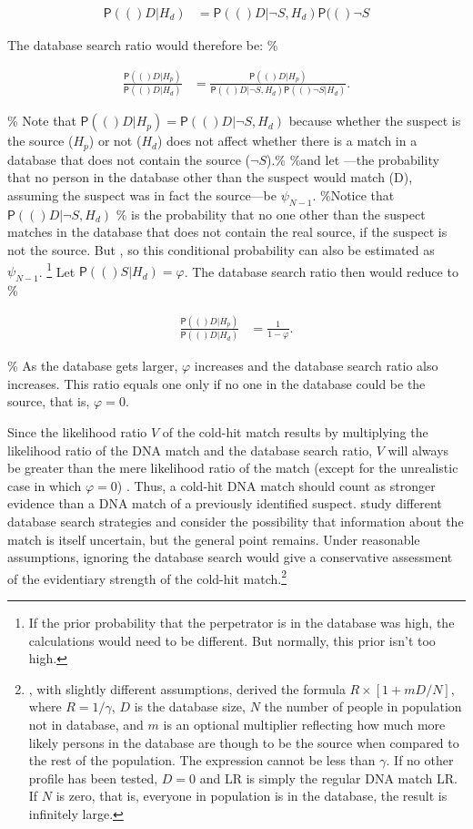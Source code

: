 \documentclass[10pt,dvipsnames,enabledeprecatedfontcommands]{scrartcl}
\newcommand{\pr}[1]{\mathsf{P}(#1)}
\begin{document}
\begin{align*}
\pr(D\vert H_d) & =  \pr(D\vert \neg S, H_d) \pr(\neg S %
\end{align*}

The database search ratio would therefore be: \%

\begin{align*}
\frac{\pr(D\vert H_p)}{\pr(D\vert H_d)} & = \frac{\pr(D\vert H_p)}{\pr(D\vert \neg S, H_d) \pr(\neg S \vert H_d)}.
\end{align*}

\% Note that \(\pr(D\vert H_p)=\pr(D\vert \neg S, H_d)\) because whether
the suspect is the source (\(H_p\)) or not (\(H_d\)) does not affect
whether there is a match in a database that does not contain the source
(\(\neg S\)).\% \%and let ---the probability that no person in the
database other than the suspect would match (D), assuming the suspect
was in fact the source---be \(\psi_{N-1}\). \%Notice that
\(\pr(D\vert \neg S, H_d)\) \% is the probability that no one other than
the suspect matches in the database that does not contain the real
source, if the suspect is not the source. But , so this conditional
probability can also be estimated as \(\psi_{N-1}\).
\footnote{If the prior probability that the perpetrator is in the database was high, the calculations would need to be different. But normally, this prior isn't too high.}
Let \(\pr(S | H_d)=\varphi\). The database search ratio then would
reduce to \%

\begin{align*}
\frac{\pr(D\vert H_p)}{\pr(D\vert H_d)} & = \frac{1}{1-\varphi}.
\end{align*}

\% As the database gets larger, \(\varphi\) increases and the database
search ratio also increases. This ratio equals one only if no one in the
database could be the source, that is, \(\varphi=0\).

Since the likelihood ratio \(V\) of the cold-hit match results by
multiplying the likelihood ratio of the DNA match and the database
search ratio, \(V\) will always be greater than the mere likelihood
ratio of the match (except for the unrealistic case in which
\(\varphi=0\)) . Thus, a cold-hit DNA match should count as stronger
evidence than a DNA match of a previously identified suspect.
\citet{dawid1996CoherentAnalysisForensic} study different database
search strategies and consider the possibility that information about
the match is itself uncertain, but the general point remains. Under
reasonable assumptions, ignoring the database search would give a
conservative assessment of the evidentiary strength of the cold-hit
match.\footnote{\citet{donnelly1999DNADatabaseSearches}, with slightly different assumptions, derived the formula $R \times [1+mD/N]$, where $R = 1/\gamma$, $D$ is the database size, $N$ the number of people in population not in database, and $m$ is an optional multiplier reflecting how much more likely persons in the database are though to be the source when compared to the rest of the population. The expression cannot be less than $\gamma$. If no other profile has been tested, $D=0$ and LR is simply the regular DNA match LR. If $N$ is zero, that is, everyone in population is in the database, the result is infinitely large.}
\end{document}
